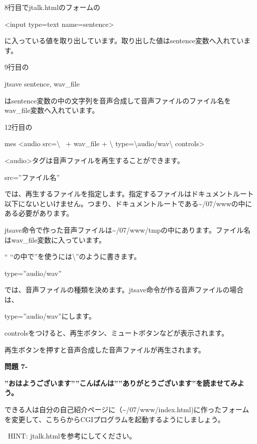 \documentclass[a4paper,12pt,dvipdfmx]{jarticle}
\newcounter{Question}
\renewcommand\theQuestion{\textbf{問題 7-\arabic{Question}}}
\begin{document}
\bigskip

8行目でjtalk.htmlのフォームの

{\textless}input type={\textquotedbl}text{\textquotedbl} name={\textquotedbl}sentence{\textquotedbl}{\textgreater}

に入っている値を取り出しています。取り出した値はsentence変数へ入れています。

9行目の

jtsave sentence, wav\_file

はsentence変数の中の文字列を音声合成して音声ファイルのファイル名をwav\_file変数へ入れています。

12行目の

mes {\textquotedbl}{\textless}audio src={\textbackslash}{\textquotedbl}{\textquotedbl} \ + wav\_file +
{\textquotedbl}{\textbackslash}{\textquotedbl}
type={\textbackslash}{\textquotedbl}audio/wav{\textbackslash}{\textquotedbl} controls{\textgreater}{\textquotedbl}

	{\textless}audio{\textgreater}タグは音声ファイルを再生することができます。

src=”ファイル名”

では、再生するファイルを指定します。指定するファイルはドキュメントルート以下にないといけません。つまり、ドキュメントルートである{\textasciitilde}/07/wwwの中にある必要があります。

jtsave命令で作った音声ファイルは{\textasciitilde}/07/www/tmpの中にあります。ファイル名はwav\_file変数に入っています。

“
“の中で”を使うには{\textbackslash}”のように書きます。

type=”audio/wav”

では、音声ファイルの種類を決めます。jtsave命令が作る音声ファイルの場合は、

type=”audio/wav”にします。

controlsをつけると、再生ボタン、ミュートボタンなどが表示されます。

再生ボタンを押すと音声合成した音声ファイルが再生されます。

\clearpage
{}\theQuestion\label{Q:Jtalk}

{\bfseries
	”おはようございます””こんばんは””ありがとうございます”を読ませてみよう。}


\bigskip

できる人は自分の自己紹介ページに（{\textasciitilde}/07/www/index.html)に作ったフォームを変更して、こちらからCGIプログラムを起動するようにしましょう。

\ HINT: jtalk.htmlを参考にしてください。
\end{document}
